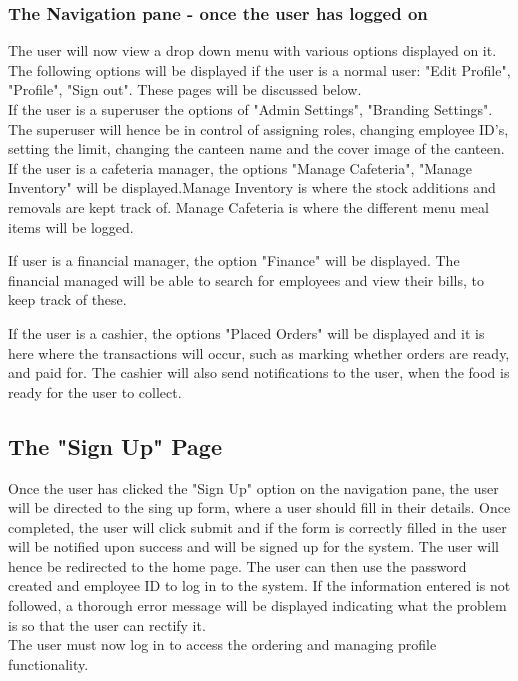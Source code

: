 \documentclass[12pt]{article}
\begin{document}
\subsubsection{The Navigation pane - once the user has logged on}
The user will now view a drop down menu with various options displayed on it. The following options will be displayed if the user is a normal user: "Edit Profile", "Profile", "Sign out". These pages will be discussed below.
\\
If the user is a superuser the options of "Admin Settings", "Branding Settings". The superuser will hence be in control of assigning roles, changing employee ID's, setting the limit, changing the canteen name and the cover image of the canteen.  
\\
If the user is a cafeteria manager, the options "Manage Cafeteria", "Manage Inventory" will be displayed.Manage Inventory is where the stock additions and removals are kept track of. Manage Cafeteria is where the different menu meal items will be logged.

If user is a financial manager, the option "Finance" will be displayed. The financial managed will be able to search for employees and view their bills, to keep track of these.

If the user is a cashier, the options "Placed Orders" will be displayed and it is here where the transactions will occur, such as marking whether orders are ready, and paid for. The cashier will also send notifications to the user, when the food is ready for the user to collect. 


\subsection{The "Sign Up" Page} 
Once the user has clicked the "Sign Up" option on the navigation pane, the user will be directed to the sing up form, where a user should fill in their details. Once completed, the user will click submit and if the form is correctly filled in the user will be notified upon success and will be signed up for the system. The user will hence be redirected to the home page. The user can then use the password created and employee ID to log in to the system. If the information entered is not followed, a thorough error message will be displayed indicating what the problem is so that the user can rectify it.
\\
The user must now log in to access the ordering and managing profile functionality.
\end{document}
